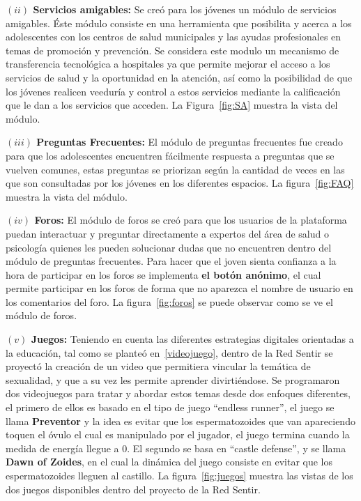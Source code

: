 \documentclass[journal,transmag]{IEEEtran}
\begin{document}
\textbf{$(ii)$ Servicios amigables:} Se creó para los jóvenes un módulo de servicios amigables. Éste módulo consiste en una herramienta que posibilita y acerca a los adolescentes con los centros de salud municipales y las ayudas profesionales en temas de promoción y prevención. Se considera este modulo un mecanismo de transferencia tecnológica a hospitales ya que permite mejorar el acceso a los servicios de salud y la oportunidad en la atención, así como la posibilidad de que los jóvenes realicen veeduría y control a estos servicios mediante la calificación que le dan a los servicios que acceden. La Figura~\ref{fig:SA} muestra la vista del módulo.

\textbf{$(iii)$ Preguntas Frecuentes:} El módulo de preguntas frecuentes fue creado para que los adolescentes encuentren fácilmente respuesta a preguntas que se vuelven comunes, estas preguntas se priorizan según la cantidad de veces en las que son consultadas por los jóvenes en los diferentes espacios. La figura~\ref{fig:FAQ} muestra la vista del módulo.

\textbf{$(iv)$ Foros:} El módulo de foros se creó para que los usuarios de la plataforma puedan interactuar y preguntar directamente a expertos del área de salud o psicología quienes les pueden solucionar dudas que no encuentren dentro del módulo de preguntas frecuentes. Para hacer que el joven sienta confianza a la hora de participar en los foros se implementa  \textbf{el botón anónimo}, el cual permite participar en los foros de forma que no aparezca el nombre de usuario en los comentarios del foro. La figura~\ref{fig:foros} se puede observar como se ve el módulo de foros.

\textbf{$(v)$ Juegos:} Teniendo en cuenta las diferentes estrategias digitales orientadas a la educación, tal como se planteó en~\ref{videojuego}, dentro de la Red Sentir se proyectó la creación de un video que permitiera vincular la temática de sexualidad, y que a su vez les permite aprender divirtiéndose. Se programaron dos videojuegos para tratar y abordar estos temas desde dos enfoques diferentes, el primero de ellos es basado en el tipo de juego ``endless runner'', el juego se llama \textbf{Preventor} y la idea es evitar que los espermatozoides que van apareciendo toquen el óvulo el cual es manipulado por el jugador, el juego termina cuando la medida de energía llegue a $0$. El segundo se basa en ``castle defense'', y se llama \textbf{Dawn of Zoides}, en el cual la dinámica del juego consiste en evitar que los espermatozoides lleguen al castillo.  La figura~\ref{fig:juegos} muestra las vistas de los dos juegos disponibles dentro del proyecto de la Red Sentir.
\end{document}
